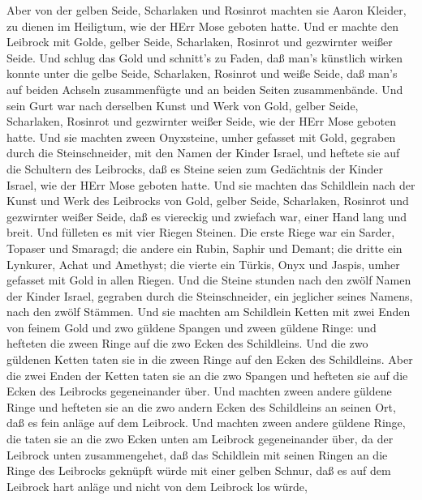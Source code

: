  Aber von der gelben Seide, Scharlaken und Rosinrot machten
sie Aaron Kleider, zu dienen im Heiligtum, wie der HErr Mose geboten
hatte.  Und er machte den Leibrock mit Golde, gelber Seide,
Scharlaken, Rosinrot und gezwirnter weißer Seide.  Und
schlug das Gold und schnitt's zu Faden, daß man's künstlich wirken
konnte unter die gelbe Seide, Scharlaken, Rosinrot und weiße Seide,
 daß man's auf beiden Achseln zusammenfügte und an beiden
Seiten zusammenbände.  Und sein Gurt war nach derselben
Kunst und Werk von Gold, gelber Seide, Scharlaken, Rosinrot und
gezwirnter weißer Seide, wie der HErr Mose geboten hatte. 
Und sie machten zween Onyxsteine, umher gefasset mit Gold, gegraben
durch die Steinschneider, mit den Namen der Kinder Israel, 
und heftete sie auf die Schultern des Leibrocks, daß es Steine seien zum
Gedächtnis der Kinder Israel, wie der HErr Mose geboten hatte.
 Und sie machten das Schildlein nach der Kunst und Werk des
Leibrocks von Gold, gelber Seide, Scharlaken, Rosinrot und gezwirnter
weißer Seide,  daß es viereckig und zwiefach war, einer Hand
lang und breit.  Und fülleten es mit vier Riegen Steinen.
Die erste Riege war ein Sarder, Topaser und Smaragd;  die
andere ein Rubin, Saphir und Demant;  die dritte ein
Lynkurer, Achat und Amethyst;  die vierte ein Türkis, Onyx
und Jaspis, umher gefasset mit Gold in allen Riegen.  Und
die Steine stunden nach den zwölf Namen der Kinder Israel, gegraben
durch die Steinschneider, ein jeglicher seines Namens, nach den zwölf
Stämmen.  Und sie machten am Schildlein Ketten mit zwei
Enden von feinem Gold  und zwo güldene Spangen und zween
güldene Ringe: und hefteten die zween Ringe auf die zwo Ecken des
Schildleins.  Und die zwo güldenen Ketten taten sie in die
zween Ringe auf den Ecken des Schildleins.  Aber die zwei
Enden der Ketten taten sie an die zwo Spangen und hefteten sie auf die
Ecken des Leibrocks gegeneinander über.  Und machten zween
andere güldene Ringe und hefteten sie an die zwo andern Ecken des
Schildleins an seinen Ort, daß es fein anläge auf dem Leibrock.
 Und machten zween andere güldene Ringe, die taten sie an
die zwo Ecken unten am Leibrock gegeneinander über, da der Leibrock
unten zusammengehet,  daß das Schildlein mit seinen Ringen
an die Ringe des Leibrocks geknüpft würde mit einer gelben Schnur, daß
es auf dem Leibrock hart anläge und nicht von dem Leibrock los würde,
